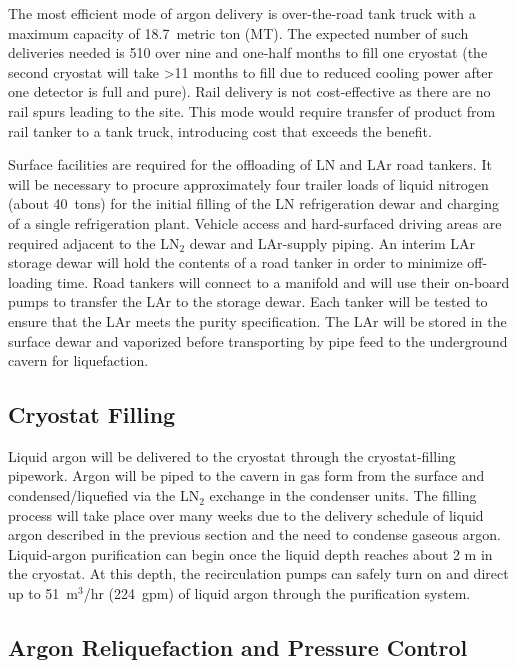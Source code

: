The most efficient mode of argon delivery is 
over-the-road tank truck with a maximum capacity of 18.7~metric ton (MT).  The expected number of such deliveries needed is 510 over nine and one-half months to fill one cryostat (the second cryostat will take >11 months to fill due to reduced cooling power after one detector is full and pure). 
Rail delivery 
is not cost-effective as there are no rail spurs leading to the site.
This mode would require transfer of product from rail tanker to a tank truck, introducing cost that exceeds the benefit.

Surface facilities are required for the offloading of LN and LAr road tankers. It will be necessary to  procure approximately four trailer loads of liquid nitrogen (about 40~tons) for the initial filling of the LN refrigeration dewar and charging of a single refrigeration plant. Vehicle access and hard-surfaced driving areas are required adjacent to the LN$_{2}$ dewar and LAr-supply piping. An interim LAr storage dewar will hold the contents of a road tanker in order to minimize off-loading time.  Road tankers will connect to a manifold and will use their on-board pumps to transfer the LAr to the storage 
dewar. Each tanker will be tested to ensure that the LAr meets the purity specification. The LAr will be 
stored in the surface dewar and vaporized before transporting by pipe feed to the
underground cavern for liquefaction.

\subsection{Cryostat Filling}

Liquid argon will be delivered to the cryostat through the cryostat-filling pipework. Argon will
be piped to the cavern in gas form from the surface
and condensed/liquefied via the LN$_{2}$ exchange in the condenser units.
The filling process will take place over many weeks due to the delivery schedule of liquid
argon described in the previous section and the need to condense gaseous argon.
Liquid-argon purification can begin once the liquid
depth reaches about 2 m in the cryostat. At this depth, the recirculation pumps can safely
turn on and direct up to 51~m$^{3}$/hr (224~gpm) of liquid argon through the purification system.

\subsection{Argon Reliquefaction and Pressure Control}
\label{subsec:reliquef}

